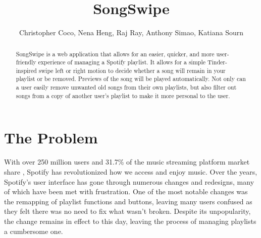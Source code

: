 \documentclass{article}
\title{SongSwipe}
\author{Christopher Coco, Nena Heng, Raj Ray, Anthony Simao, Katiana Sourn}
\begin{document}
\maketitle

\begin{abstract}
SongSwipe is a web application that allows for an easier, quicker, and more user-friendly experience of managing a Spotify playlist. It allows for a simple Tinder-inspired swipe left or right motion to decide whether a song will remain in your playlist or be removed. Previews of the song will be played automatically. Not only can a user easily remove unwanted old songs from their own playlists, but also filter out songs from a copy of another user's playlist to make it more personal to the user.
\end{abstract}

\section{The Problem}
With over 250 million users and 31.7\% of the music streaming platform market share \cite{Spotify_stats}, Spotify \cite{Spotify_app} has revolutionized how we access and enjoy music. Over the years, Spotify's user interface has gone through numerous changes and redesigns, many of which have been met with frustration. One of the most notable changes was the remapping of playlist functions and buttons, leaving many users confused as they felt there was no need to fix what wasn't broken. Despite its unpopularity, the change remains in effect to this day, leaving the process of managing playlists a cumbersome one.\\
\end{document}
